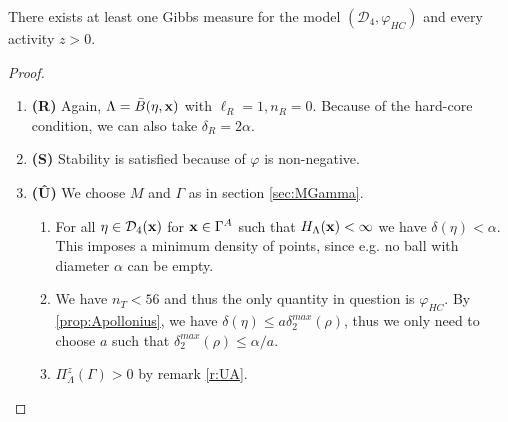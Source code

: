 \begin{proposition}\label{prop:E2}
	There exists at least one Gibbs measure for the model $(\mathcal D_4,\varphi_{HC})$ and every activity $z>0.$
\end{proposition}
\begin{proof}
\begin{enumerate}[]
	\item \textbf{(R)} Again, $\Lambda = \bar B(\eta,{\mathbf{x}})$ with $\ell_R = 1, n_R = 0$. Because of the hard-core condition, we can also take $\delta_R = 2\alpha$.
	\item \textbf{(S)} Stability is satisfied because of $\varphi$ is non-negative.
	\item \textbf{(\^U)} We choose $M$ and $\Gamma$ as in section \ref{sec:MGamma}.
		\begin{enumerate}[(\^U1)]
			\item For all $\eta \in \mathcal D_4({\mathbf{x}})$ for ${\mathbf{x}}\in\Gamma^A$ such that $H_\Lambda({\mathbf{x}})<\infty$ we have $\delta(\eta) < \alpha$. This imposes a minimum density of points, since e.g. no ball with diameter $\alpha$ can be empty. 
			\item We have $n_T<56$ and thus the only quantity in question is $\varphi_{HC}$. By \ref{prop:Apollonius}, we have $\delta(\eta)\leq a\delta^{max}_2(\rho)$, thus we only need to choose $a$ such that $\delta^{max}_2(\rho) \leq \alpha / a$.
			\item $\Pi^z_\Lambda(\Gamma)>0$ by remark \ref{r:UA}.
		\end{enumerate}
\end{enumerate}
\end{proof}



